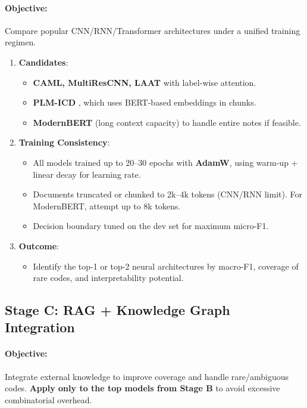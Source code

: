 \documentclass[12pt,a4paper]{report}
\begin{document}
\paragraph{Objective:} Compare popular CNN/RNN/Transformer architectures under a unified training regimen.

\begin{enumerate}
    \item \textbf{Candidates}:
    \begin{itemize}
        \item \textbf{CAML, MultiResCNN, LAAT} \cite{mullenbach2018explainable,li2020multi,vu2020label} with label-wise attention.
        \item \textbf{PLM-ICD} \cite{huang2022plm}, which uses BERT-based embeddings in chunks.
        \item \textbf{ModernBERT} (long context capacity) to handle entire notes if feasible.
    \end{itemize}
    \item \textbf{Training Consistency}:
    \begin{itemize}
        \item All models trained up to 20--30 epochs with \textbf{AdamW}, using warm-up + linear decay for learning rate.
        \item Documents truncated or chunked to 2k--4k tokens (CNN/RNN limit). For ModernBERT, attempt up to 8k tokens.
        \item Decision boundary tuned on the dev set for maximum micro-F1.
    \end{itemize}
    \item \textbf{Outcome}:
    \begin{itemize}
        \item Identify the top-1 or top-2 neural architectures by macro-F1, coverage of rare codes, and interpretability potential.
    \end{itemize}
\end{enumerate}


\subsection{Stage C: RAG + Knowledge Graph Integration}
\paragraph{Objective:} Integrate external knowledge to improve coverage and handle rare/ambiguous codes. \textbf{Apply only to the top models from Stage B} to avoid excessive combinatorial overhead.
\end{document}
